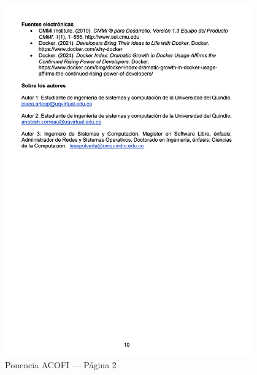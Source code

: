 \begin{figure}[H]
    \centering
    \begin{tcolorbox}[
        colback=white,
        colframe=gray!50,
        boxrule=1pt,
        arc=2pt,
        boxsep=5pt,
        left=3pt,
        right=3pt,
        top=3pt,
        bottom=3pt,
        drop shadow
    ]
        \includegraphics[width=0.95\textwidth,keepaspectratio]{apendices/ACOFI/pagina_2.png}
    \end{tcolorbox}
    \caption{Ponencia ACOFI --- Página 2}\label{fig:acofi-pagina-2}
\end{figure}
\FloatBarrier%

